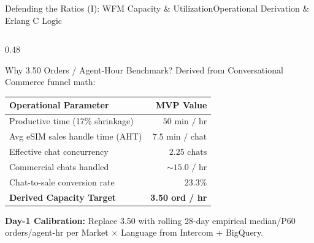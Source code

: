 \documentclass[aspectratio=169,8pt]{beamer}
\newcommand{\code}[1]{{\fontfamily{pcr}\selectfont\fontsize{6.5}{8.0}\selectfont\color{ink}#1}}
\begin{document}
\begin{frame}[t]{Defending the Ratios (I): WFM Capacity \& Utilization}{Operational Derivation \& Erlang C Logic}
\vspace{2pt}
\begin{columns}[T,onlytextwidth]
  \begin{column}{0.48\textwidth}
    \begin{hfcard}{Why 3.50 Orders / Agent-Hour Benchmark?}
      {\fontsize{6.6}{8.2}\selectfont Derived from Conversational Commerce funnel math:}
      \vspace{3pt}
      \renewcommand{\arraystretch}{1.16}
      {\fontsize{6.5}{8.0}\selectfont
      \begin{tabularx}{\linewidth}{@{}>{\raggedright\arraybackslash}X r@{}}
        \toprule
        \rowcolor{linen} \textbf{Operational Parameter} & \textbf{MVP Value} \\
        \midrule
        Productive time (17\% shrinkage) & $50\text{ min / hr}$ \\
        Avg eSIM sales handle time (AHT) & $7.5\text{ min / chat}$ \\
        Effective chat concurrency & $2.25\text{ chats}$ \\
        Commercial chats handled & $\sim 15.0\text{ / hr}$ \\
        Chat-to-sale conversion rate & $23.3\%$ \\
        \midrule
        \rowcolor{softgreen} \textbf{Derived Capacity Target} & \textbf{3.50 ord / hr} \\
        \bottomrule
      \end{tabularx}
      }
      \vspace{3pt}
      {\fontsize{6.4}{8.0}\selectfont\color{iron}\textbf{Day-1 Calibration:} Replace \code{3.50} with rolling 28-day empirical median/P60 orders/agent-hr per \code{Market $\times$ Language} from Intercom + BigQuery.}
    \end{hfcard}
  \end{column}


\end{columns}
\end{frame}
\end{document}

